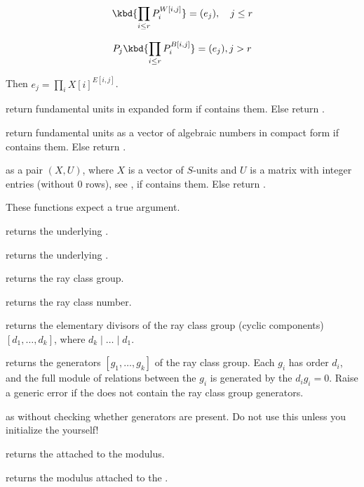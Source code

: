 $$\kbd{\prod_{i \leq r} P_i^{W[i,j]}} = (e_j),\quad j \leq r$$

$$ P_j \kbd{\prod_{i \leq r} P_i^{B[i,j]}} = (e_j), j > r$$

\noindent Then $e_j = \prod_i X[i]^{E[i,j]}$.

 return fundamental units in expanded form if
 contains them. Else return .

 return fundamental units as a vector
of algebraic numbers in compact form if  contains them. Else return
.

 as a pair $(X,U)$, where $X$ is a
vector of $S$-units and $U$ is a matrix with integer entries (without $0$
rows), see , if  contains them. Else return
.


These functions expect a true  argument.

 returns the underlying .

 returns the underlying .

 returns the ray class group.

 returns the ray class number.

 returns the elementary divisors
of the ray class group (cyclic components) $[d_1,\ldots, d_k]$, where
$d_k \mid \ldots \mid d_1$.

 returns the generators $[g_1,\ldots,g_k]$ of
the ray class group. Each $g_i$ has order $d_i$, and the full module of
relations between the $g_i$ is generated by the $d_ig_i = 0$. Raise
a generic error if the  does not contain the ray class group
generators.

 as  without
checking whether generators are present. Do not use this unless
you initialize the  yourself!

 returns the  attached
to the  modulus.

 returns the modulus attached
to the .


